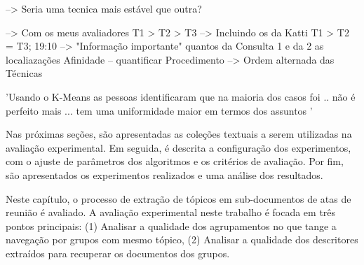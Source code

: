 
--> Seria uma tecnica mais estável que  outra? 


--> Com os meus avaliadores T1 > T2 > T3
--> Incluindo os da Katti   T1 > T2 = T3;
19:10 --> "Informação importante"
quantos da Consulta 1 e da 2
as localiazações
Afinidade -- quantificar
Procedimento --> Ordem alternada das Técnicas






'Usando o K-Means as pessoas identificaram que na maioria dos casos foi .. não é perfeito mais ... tem uma uniformidade maior em termos dos assuntos '













Nas próximas seções, são apresentadas as coleções textuais a serem utilizadas na avaliação experimental. Em seguida, é descrita a configuração dos experimentos, com o ajuste de parâmetros dos algoritmos e os critérios de avaliação. Por fim, são apresentados os experimentos realizados e uma análise dos resultados.





Neste capítulo, o processo de extração de tópicos em sub-documentos de atas de reunião é avaliado. A avaliação experimental neste trabalho é focada em três pontos principais: 
(1) Analisar a qualidade dos agrupamentos no que tange a navegação por grupos com mesmo tópico, 
(2) Analisar a qualidade dos descritores extraídos para recuperar os documentos dos grupos.











